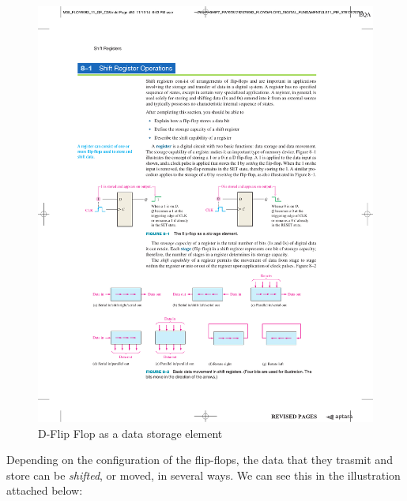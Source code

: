 \begin{figure}[H]
    \centering
    \includegraphics[scale = 1]{Graphics/Practice 5/SHIFT_REGISTER_BASICS/D-Latch_Operation_451_2.pdf}
    \caption{D-Flip Flop as a data storage element ~\autocite{FLOYD}}
    \label{fig:D_FLIP_FLOP}
\end{figure}

\clearpage

Depending on the configuration of the flip-flops, the data that they trasmit and store can be \textit{shifted}, or moved, in several ways. We can see this in the illustration attached below:

